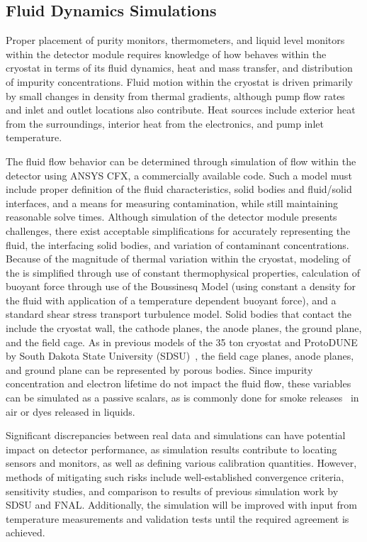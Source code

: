 \subsection{Fluid Dynamics Simulations}
\label{sec:fdgen-slow-cryo-cfd}

Proper placement of purity monitors, thermometers, and liquid level monitors within the detector module requires knowledge of how  behaves within the cryostat in terms of its fluid dynamics, heat and mass transfer, and distribution of impurity concentrations. 
Fluid motion within the cryostat is driven primarily by small changes in density from thermal gradients, although pump flow rates and inlet and outlet locations also contribute. 
Heat sources include exterior heat from the surroundings, interior heat from the electronics, and pump inlet temperature.

The fluid flow behavior can be determined through simulation of  flow within the detector using ANSYS CFX, a commercially available  code. Such a model must include proper definition of the fluid characteristics, solid bodies and fluid/solid interfaces, and a means for measuring contamination, while still maintaining reasonable solve times.
Although simulation of the detector module presents challenges, there exist acceptable simplifications for accurately representing the fluid, the interfacing solid bodies, and variation of contaminant concentrations. Because of the magnitude of thermal variation within the cryostat, modeling of the  is simplified through use of constant thermophysical properties, calculation of buoyant force through use of the Boussinesq Model (using constant a density for the fluid with application of a temperature dependent buoyant force), and a standard shear stress transport turbulence model. Solid bodies that contact the  include the cryostat wall, the cathode planes, the anode planes, the ground plane, and the field cage. As in previous  models of the 35 ton cryostat and ProtoDUNE by South Dakota State University (SDSU)~\cite{docdb-5915}, the field cage planes, anode planes, and ground plane can be represented by porous bodies. Since impurity concentration and electron lifetime do not impact the fluid flow, these variables can be simulated as a passive scalars, as is commonly done for smoke releases~\cite{cfd-1} in air or dyes released in liquids.

Significant discrepancies between real data and simulations can have potential impact on detector performance, as simulation results contribute to locating sensors and monitors, as well as defining various calibration quantities. However, methods of mitigating such risks include well-established convergence criteria, sensitivity studies, and comparison to results of previous  simulation work by SDSU and FNAL. Additionally, the simulation will be improved with input from temperature measurements and validation tests until the required agreement is achieved.

